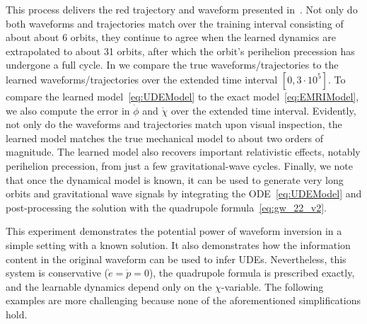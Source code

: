 \documentclass[ reprint,
nofootinbib,
 amsmath,amssymb,
 aps,
]{revtex4-2}
\begin{document}
This process delivers the red trajectory and waveform presented in~.
Not only do both waveforms and trajectories match over the training interval consisting of about about 6 orbits, they continue to agree when the learned dynamics are extrapolated to about 31 orbits, after which the orbit's perihelion precession
has undergone a full cycle. 
In  we compare the true waveforms/trajectories to the learned waveforms/trajectories over the extended time interval $[0, 3\cdot 10^5]$.
To compare the learned model~\cref{eq:UDEModel} to the exact model~\cref{eq:EMRIModel}, we also compute the error in $\dot{\phi}$ and $\dot{\chi}$ over the extended time interval.
Evidently, not only do the waveforms and trajectories match upon visual inspection, the learned model matches the
true mechanical model to about two orders of magnitude. The learned model also recovers important 
relativistic effects, notably perihelion precession, from just a few gravitational-wave cycles. Finally, we note 
that once the dynamical model is known, it can be used to generate very long orbits and gravitational wave
signals by integrating the ODE~\cref{eq:UDEModel} and post-processing the solution with the quadrupole formula~\cref{eq:gw_22_v2}.

This experiment demonstrates the potential power of waveform inversion in a simple setting with a known
solution.
It also demonstrates how the information content in the original waveform can be used to infer UDEs.
Nevertheless, this system is conservative ($\dot{e}=\dot{p}=0$), the quadrupole formula is prescribed exactly, and the learnable dynamics depend only on the $\chi$-variable. The following examples are more challenging because none of the aforementioned simplifications hold.
\end{document}
